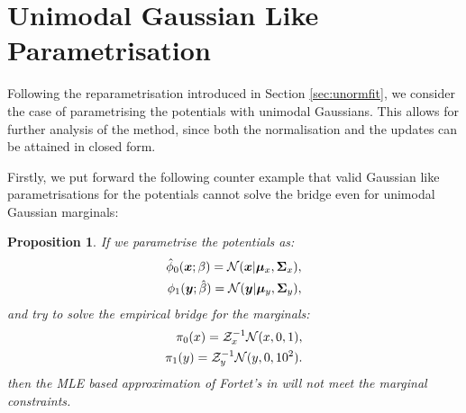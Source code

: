 \documentclass[a4paper,12pt,twoside,openright]{report}
\newtheorem{proposition}{Proposition}
\theoremstyle{definition}
\begin{document}
\section{Unimodal Gaussian Like Parametrisation}

Following the reparametrisation introduced in Section \ref{sec:unormfit}, we consider the case of parametrising the potentials with unimodal Gaussians. This allows for further analysis of the method, since both the normalisation and the updates can be attained in closed form. 

Firstly, we put forward the following counter example that valid Gaussian like parametrisations for the potentials cannot solve the bridge even for unimodal Gaussian marginals:
\begin{proposition}
If we parametrise the potentials as:
\begin{align}
{\hat{\phi}}_0( {\bm{x}} ; \beta) =  {\mathcal{N}}({\bm{x}} | {\bm{\mu}}_x, {\bm{\Sigma}}_x), \\
\phi_1( {\bm{y}} ; \hat{\beta}) =  {\mathcal{N}}({\bm{y}} | {\bm{\mu}}_y, {\bm{\Sigma}}_y) ,
\end{align}
and try to solve the empirical bridge for the marginals:
\begin{align*}
    \pi_0(x) =  \mathcal{Z}_x^{-1}{\mathcal{N}}(x,0, 1), \\
    \pi_1(y) = \mathcal{Z}_y^{-1} {\mathcal{N}}(y,0, 10^2) .
\end{align*}
then the MLE based approximation of Fortet's in \cite{pavon2018data} will not meet the marginal constraints.
\end{proposition}
\end{document}
